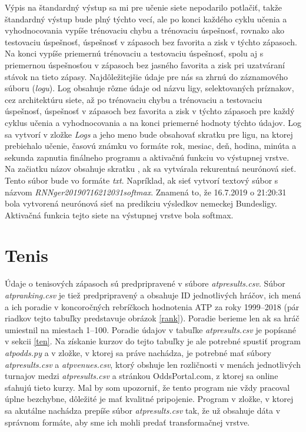 Výpis na štandardný výstup sa mi pre učenie siete nepodarilo potlačiť, takže štandardný výstup bude plný týchto vecí, ale po konci každého cyklu učenia a vyhodnocovania vypíše trénovaciu chybu a trénovaciu úspešnosť, rovnako ako testovaciu úspešnosť, úspešnosť v zápasoch bez favorita a zisk v týchto zápasoch.
Na konci vypíše priemernú trénovaciu a testovaciu úspešnosť, spolu aj s priemernou úspešnosťou v zápasoch bez jasného favorita a zisk pri uzatváraní stávok na tieto zápasy. 
Najdôležitejšie údaje pre nás sa zhrnú do záznamového súboru (\textit{logu}). 
Log obsahuje rôzne údaje od názvu ligy, selektovaných príznakov, cez architektúru siete, až po trénovaciu chybu a trénovaciu a testovaciu úspešnosť, úspešnosť v zápasoch bez favorita a zisk v týchto zápasoch pre každý cyklus učenia a vyhodnocovania a na konci priemerné hodnoty týchto údajov.
Log sa vytvorí v zložke \textit{Logs} a jeho meno bude obsahovať skratku pre ligu, na ktorej prebiehalo učenie, časovú známku vo formáte rok, mesiac, deň, hodina, minúta a sekunda zapnutia finálneho programu a aktivačnú funkciu vo výstupnej vrstve. Na začiatku názov obsahuje skratku , ak sa vytvárala rekurentná neurónová sieť. Tento súbor bude vo formáte \textit{txt}.
Napríklad, ak sieť vytvorí textový súbor s názvom \textit{RNNger20190716212031softmax}. Znamená to, že 16.7.2019 o 21:20:31 bola vytvorená neurónová sieť na predikciu výsledkov nemeckej Bundesligy.
Aktivačná funkcia tejto siete na výstupnej vrstve bola softmax.

\section{Tenis}

Údaje o tenisových zápasoch sú predpripravené v súbore \textit{atpresults.csv}.
Súbor \textit{atpranking.csv} je tiež predpripravený a obsahuje ID jednotlivých hráčov, ich mená a ich poradie v koncoročných rebríčkoch hodnotenia ATP za roky 1999--2018 (pár riadkov tejto tabuľky predstavuje obrázok \ref{rank}).
Poradie berieme len ak sa hráč umiestnil na miestach 1--100.
Poradie údajov v tabuľke \textit{atpresults.csv} je popísané v sekcii \ref{ten}.
Na získanie kurzov do tejto tabuľky je ale potrebné spustiť program \textit{atpodds.py} a v zložke, v ktorej sa práve nachádza, je potrebné mať súbory \textit{atpresults.csv} a \textit{atpvenues.csv}, ktorý obshuje len rozličnosti v menách jednotlivých turnajov medzi \textit{atpresults.csv} a stránkou OddsPortal.com, z ktorej sa online sťahujú tieto kurzy.
Mal by som upozorniť, že tento program nie vždy pracoval úplne bezchybne, dôležité je mať kvalitné pripojenie.
Program v zložke, v ktorej sa akutálne nachádza prepíše súbor \textit{atpresults.csv} tak, že už obsahuje dáta v správnom formáte, aby sme ich mohli predať transformačnej vrstve.

